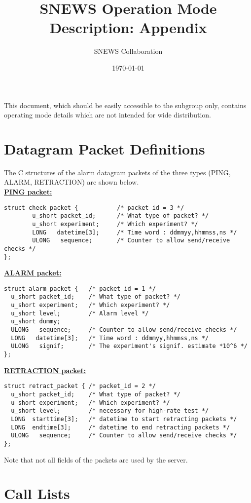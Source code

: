 \documentclass{article}
\begin{document}
\title{SNEWS Operation Mode Description: Appendix}         
\author{SNEWS Collaboration}
\date{\today}
\maketitle

This document, which should
be easily accessible to the subgroup only,
contains operating mode details which are not intended
for wide distribution.  

\section{Datagram Packet Definitions}      

The C structures of the alarm datagram packets of the three types 
(PING, ALARM, RETRACTION) are shown below.\\


\noindent
\underline{\textbf{PING packet:}}

\begin{verbatim}
struct check_packet {           /* packet_id = 3 */
        u_short packet_id;      /* What type of packet? */  
        u_short experiment;     /* Which experiment? */
        LONG   datetime[3];     /* Time word : ddmmyy,hhmmss,ns */
        ULONG   sequence;       /* Counter to allow send/receive checks */
};
\end{verbatim}

\noindent
\underline{\textbf{ALARM packet:}}

\begin{verbatim}
struct alarm_packet {   /* packet_id = 1 */
  u_short packet_id;    /* What type of packet? */  
  u_short experiment;   /* Which experiment? */
  u_short level;        /* Alarm level */
  u_short dummy;
  ULONG   sequence;     /* Counter to allow send/receive checks */
  LONG   datetime[3];   /* Time word : ddmmyy,hhmmss,ns */
  ULONG   signif;       /* The experiment's signif. estimate *10^6 */
};

\end{verbatim}

\noindent
\underline{\textbf{RETRACTION packet:}}

\begin{verbatim}
struct retract_packet { /* packet_id = 2 */ 
  u_short packet_id;    /* What type of packet? */   
  u_short experiment;   /* Which experiment? */ 
  u_short level;        /* necessary for high-rate test */ 
  LONG  starttime[3];   /* datetime to start retracting packets */ 
  LONG  endtime[3];     /* datetime to end retracting packets */ 
  ULONG   sequence;     /* Counter to allow send/receive checks */ 
}; 

\end{verbatim}
Note that not all fields of the packets are used by the server.

\section{Call Lists}      
\end{document}
